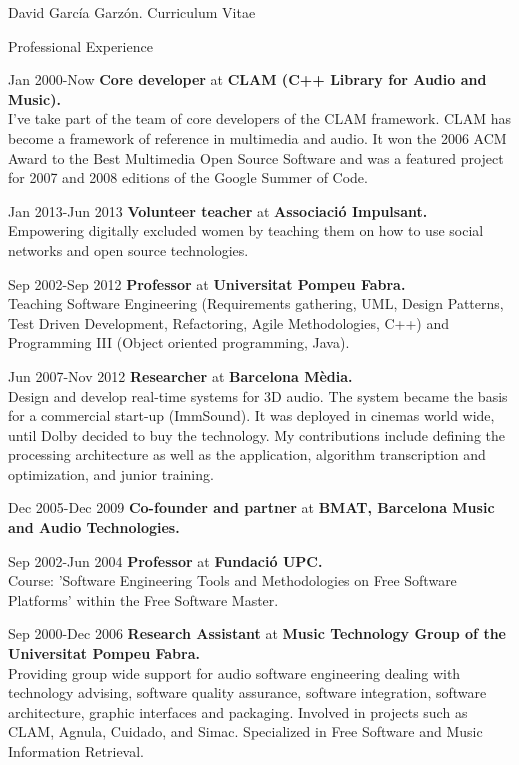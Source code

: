 \documentclass{article}
\begin{document}
\begin{cv}{David García Garzón. Curriculum Vitae}
\begin{cvlist}{Professional Experience}
\item[Jan 2000-Now]
{\bf Core developer} at
{\bf CLAM (C++ Library for Audio and Music).}\\
I've take part of the team of core developers of the CLAM framework. CLAM has become a framework of reference in multimedia and audio. It won the 2006 ACM Award to the Best Multimedia Open Source Software and was a featured project for 2007 and 2008 editions of the Google Summer of Code.

\item[Jan 2013-Jun 2013]
{\bf Volunteer teacher} at
{\bf Associació Impulsant.}\\
Empowering digitally excluded women by teaching them on how to use social networks and open source technologies. 

\item[Sep 2002-Sep 2012]
{\bf Professor} at
{\bf Universitat Pompeu Fabra.}\\
Teaching Software Engineering (Requirements gathering, UML, Design Patterns, Test Driven Development, Refactoring, Agile Methodologies, C++) and Programming III (Object oriented programming, Java).

\item[Jun 2007-Nov 2012]
{\bf Researcher} at
{\bf Barcelona Mèdia.}\\
Design and develop real-time systems for 3D audio. The system became the basis for a commercial start-up (ImmSound). It was deployed in cinemas world wide, until Dolby decided to buy the technology. My contributions include defining the processing architecture as well as the application, algorithm transcription and optimization, and junior training. 

\item[Dec 2005-Dec 2009]
{\bf Co-founder and partner} at
{\bf BMAT, Barcelona Music and Audio Technologies.}\\


\item[Sep 2002-Jun 2004]
{\bf Professor} at
{\bf Fundació UPC.}\\
Course: 'Software Engineering Tools and Methodologies on Free Software Platforms' within the Free Software Master.

\item[Sep 2000-Dec 2006]
{\bf Research Assistant} at
{\bf Music Technology Group of the Universitat Pompeu Fabra.}\\
Providing group wide support for audio software engineering dealing with technology advising, software quality assurance, software integration, software architecture, graphic interfaces and packaging. Involved in projects such as CLAM, Agnula, Cuidado, and Simac. Specialized in Free Software and Music Information Retrieval.


\end{cvlist}
\end{cv}
\end{document}

